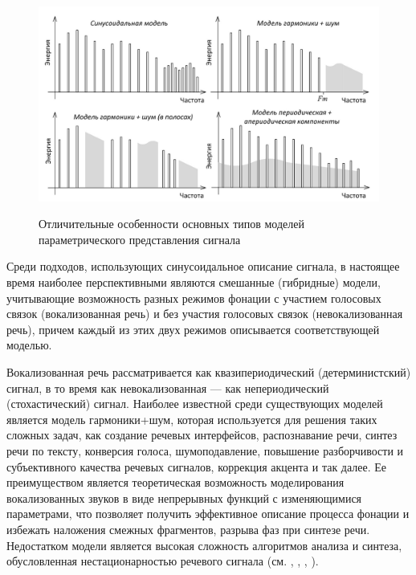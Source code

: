 \begin{figure}[H]
    \caption{Отличительные особенности  основных типов моделей параметрического представления сигнала}
    \includegraphics[scale=1.0, width=1.0\textwidth]{author/part4/figures/ch43_fig05_signal-model-types-ru.png}
    \label{fig:signal-model-types-ru}
\end{figure}

Среди подходов, использующих синусоидальное описание сигнала, в настоящее время наиболее перспективными являются смешанные (гибридные) модели, учитывающие возможность разных режимов фонации с участием голосовых связок (вокализованная речь) и без участия голосовых связок (невокализованная речь), причем каждый из этих двух режимов описывается соответствующей моделью. 

Вокализованная речь рассматривается как квазипериодический (детерминистский) сигнал, в то время как невокализованная --- как непериодический (стохастический) сигнал. Наиболее известной среди существующих моделей является модель гармоники+шум, которая используется для решения таких сложных задач, как создание речевых интерфейсов, распознавание речи, синтез речи по тексту, конверсия голоса, шумоподавление, повышение разборчивости и субъективного качества речевых сигналов, коррекция акцента и так далее. Ее преимуществом является теоретическая возможность моделирования вокализованных звуков в виде непрерывных функций с изменяющимися параметрами, что позволяет получить эффективное описание процесса фонации и избежать наложения смежных фрагментов, разрыва фаз при синтезе речи. Недостатком модели является высокая сложность алгоритмов анализа и синтеза, обусловленная нестационарностью речевого сигнала (см. , , , ). 

